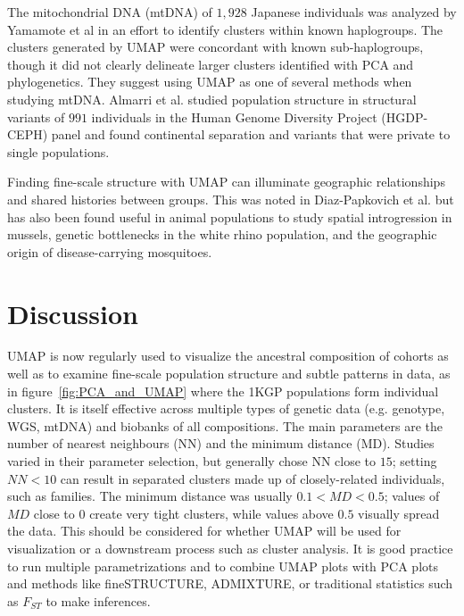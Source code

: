 \documentclass[12pt]{article}
\begin{document}
The mitochondrial DNA (mtDNA) of $1,928$ Japanese individuals was analyzed by Yamamote et al in an effort to identify clusters within known haplogroups\cite{yamamoto_genetic_2020}. The clusters generated by UMAP were concordant with known sub-haplogroups, though it did not clearly delineate larger clusters identified with PCA and phylogenetics. They suggest using UMAP as one of several methods when studying mtDNA. Almarri et al.\cite{almarri_population_2020} studied population structure in structural variants of $991$ individuals in the Human Genome Diversity Project (HGDP-CEPH) panel and found continental separation and variants that were private to single populations.

Finding fine-scale structure with UMAP can illuminate geographic relationships and shared histories between groups. This was noted in Diaz-Papkovich et al.\cite{diaz-papkovich_umap_2019} but has also been found useful in animal populations to study spatial introgression in mussels\cite{simon_local_2019}, genetic bottlenecks in the white rhino population\cite{sanchez-barreiro_historical_2020}, and the geographic origin of disease-carrying mosquitoes\cite{consortium_genome_2020}\cite{schmidt_population_2020}.

\section*{Discussion}

UMAP is now regularly used to visualize the ancestral composition of cohorts as well as to examine fine-scale population structure and subtle patterns in data, as in figure~\ref{fig:PCA_and_UMAP} where the 1KGP populations form individual clusters. It is itself effective across multiple types of genetic data (e.g. genotype, WGS, mtDNA) and biobanks of all compositions. The main parameters are the number of nearest neighbours (NN) and the minimum distance (MD). Studies varied in their parameter selection, but generally chose NN close to $15$; setting $NN < 10$ can result in separated clusters made up of closely-related individuals, such as families. The minimum distance was usually $0.1 < MD < 0.5$; values of $MD$ close to $0$ create very tight clusters, while values above $0.5$ visually spread the data. This should be considered for whether UMAP will be used for visualization or a downstream process such as cluster analysis. It is good practice to run multiple parametrizations and to combine UMAP plots with PCA plots and methods like fineSTRUCTURE\cite{lawson2012inference}, ADMIXTURE\cite{alexander2009fast}, or traditional statistics such as $F_{ST}$ to make inferences.
\end{document}
